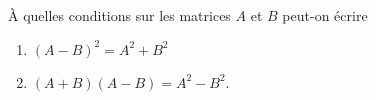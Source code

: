 \begin{exercice}\label{exoLineraire0011}

À quelles conditions sur les matrices $A$ et $B$ peut-on écrire
\begin{enumerate}

\item
$(A-B)^2=A^2+B^2$
\item
$(A+B)(A-B)=A^2-B^2$.
\end{enumerate}


\end{exercice}
